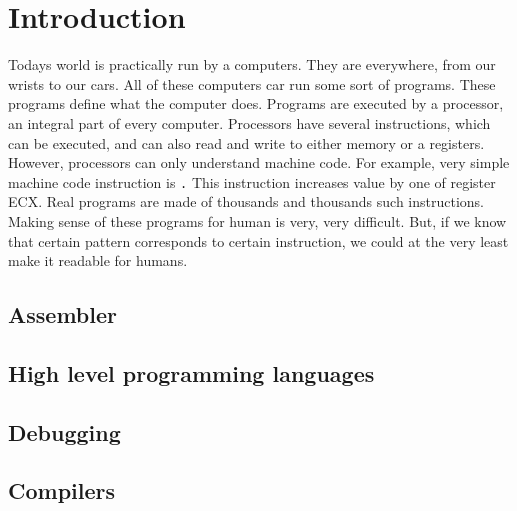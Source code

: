\chapter{Introduction}
Todays world is practically run by a computers. They are everywhere, from our wrists to our cars.
All of these computers car run some sort of programs. These programs define what the computer does.
Programs are executed by a processor, an integral part of every computer. Processors have several instructions, which can be executed, and can also read and write to either memory or a registers. However, processors can only understand machine code. For example, very simple machine code instruction is \texttt. This instruction increases value by one of register ECX. Real programs are made of thousands and thousands such instructions. Making sense of these programs for human is very, very difficult. But, if we know that certain pattern corresponds to certain instruction, we could at the very least make it readable for humans.

\section{Assembler}


\section{High level programming languages}
\section{Debugging}
\section{Compilers}

